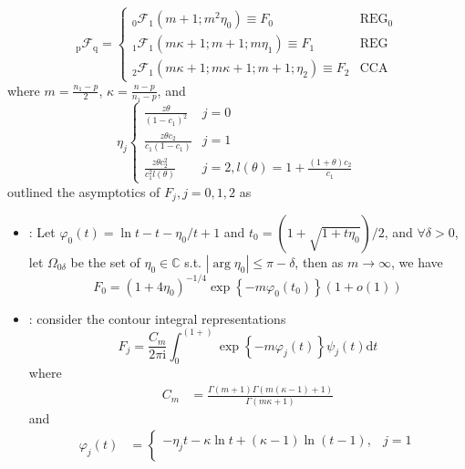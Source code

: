 \documentclass[twoside]{article}
\begin{document}
\begin{itemize}
\begin{itemize}
        \begin{equation}
            _{\mathrm{p}}\mathcal{F}_{\mathrm{q}} = \begin{cases}
                _{\mathrm{0}}\mathcal{F}_{\mathrm{1}} (m+1;m^2\eta_0) \equiv F_0 & \text{REG}_0 \\
                _{\mathrm{1}}\mathcal{F}_{\mathrm{1}} (m\kappa + 1; m+1; m\eta_1) \equiv F_1 & \text{REG} \\
                _{\mathrm{2}}\mathcal{F}_{\mathrm{1}} (m\kappa +1; m\kappa+1;m+1;\eta_2) \equiv F_2 & \text{CCA}
            \end{cases}
        \end{equation}
        where $m=\frac{n_1-p}{2}$, $\kappa = \frac{n-p}{n_1-p}$, and 
        \begin{equation*}
            \eta_j\begin{cases}
                \frac{z\theta}{(1-c_1)^2} & j=0\\
                \frac{z\theta c_2}{c_1(1-c_1)} & j=1\\
                \frac{z\theta c_2^2}{c_1^2 l(\theta)} & j=2, l(\theta)=1+\frac{(1+\theta)c_2}{c_1}
            \end{cases}
        \end{equation*}
        \citet{johnstone2020testing} outlined the asymptotics of $F_j,j=0,1,2$ as 
        \begin{itemize}
            \item {}: Let $\varphi_0(t)=\ln t - t -\eta_0/t+1$ and $t_0 = (1+\sqrt{1+t\eta_0})/2$, and $\forall \delta >0$, let $\Omega_{0\delta}$ be the set of $\eta_0\in\mathbb{C}$ s.t. $\left\vert \arg \eta_0 \right\vert\leq \pi-\delta$, then as $m\rightarrow \infty$, we have
            $$
                F_0 = (1+4\eta_0)^{-1/4}\exp\left\{ -m\varphi_0(t_0) \right\}(1+o(1))
            $$
            \item {}: consider the contour integral representations $$ F_j = \frac{C_m}{2\pi \mathrm{i}} \int^{(1+)}_{0} \exp\left\{ -m\varphi_j(t) \right\}\psi_j(t)\mathrm{d}t $$ where
            \begin{align*}
                C_m&=\frac{\Gamma (m+1)\Gamma(m(\kappa-1)+1)}{\Gamma(m\kappa +1)}
            \end{align*}
            and 
            \begin{align*}
                \varphi_j(t)&=\begin{cases}
                    -\eta_j t-\kappa\ln t + (\kappa-1)\ln(t-1), &j=1\\

\end{cases}
\end{align*}
\end{itemize}
\end{itemize}
\end{itemize}
\end{document}
